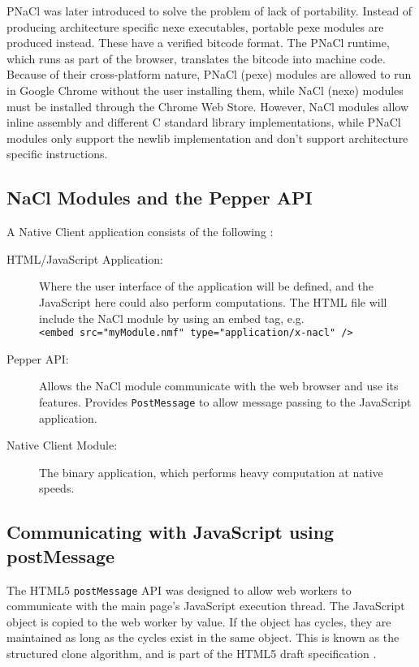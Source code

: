 PNaCl was later introduced to solve the problem of lack of portability. Instead of producing architecture specific nexe executables, portable pexe modules are produced instead. These have a verified bitcode format. The PNaCl runtime, which runs as part of the browser, translates the bitcode into machine code. Because of their cross-platform nature, PNaCl (pexe) modules are allowed to run in Google Chrome without the user installing them, while NaCl (nexe) modules must be installed through the Chrome Web Store. However, NaCl modules allow inline assembly and different C standard library implementations, while PNaCl modules only support the newlib implementation and don't support architecture specific instructions.

\subsection{NaCl Modules and the Pepper API} %
\label{sub:nacl_modules_ppapi}
A Native Client application consists of the following \cite{nacloverview}:
\begin{description}
  \item[HTML/JavaScript Application:] 
  Where the user interface of the application will be defined, and the JavaScript here could also perform computations. The HTML file will include   the NaCl module by using an embed tag, e.g. \\
   \lstinline+<embed src="myModule.nmf" type="application/x-nacl" />+
  \item[Pepper API:] 
  Allows the NaCl module communicate with the web browser and use its features. Provides \lstinline+PostMessage+ to allow message passing to the JavaScript application.
  \item[Native Client Module:] 
  The binary application, which performs heavy computation at native speeds.
\end{description}


\subsection{Communicating with JavaScript using postMessage} %
\label{sub:postmessage_intro}
The HTML5 \lstinline+postMessage+ API was designed to allow web workers to communicate with the main page's JavaScript execution thread. The JavaScript object is copied to the web worker by value. If the object has cycles, they are maintained as long as the cycles exist in the same object. This is known as the structured clone algorithm, and is part of the HTML5 draft specification \cite{html5w3c}. 

